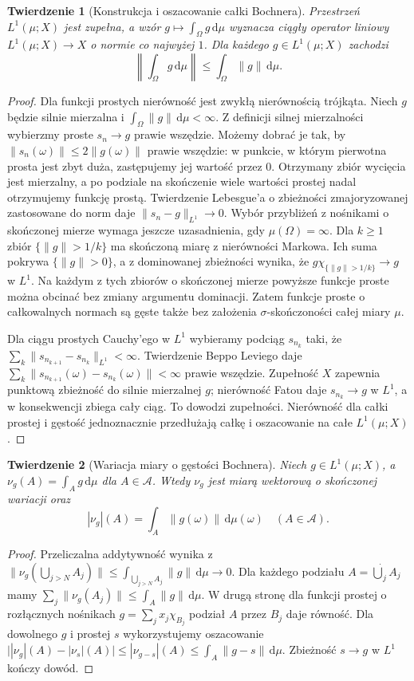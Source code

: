 \documentclass[11pt,a4paper,oneside]{book}
\numberwithin{equation}{chapter}
\theoremstyle{plain}
\newtheorem{twierdzenie}{Twierdzenie}[chapter]
\theoremstyle{definition}
\theoremstyle{remark}
\begin{document}
\begin{twierdzenie}[Konstrukcja i oszacowanie całki Bochnera]
\label{thm:bochner-basic-30}
Przestrzeń $L^1(\mu;X)$ jest zupełna, a wzór
$g\mapsto\int_\Omega g\,\mathrm d\mu$ wyznacza
ciągły operator liniowy $L^1(\mu;X)\to X$
o normie co najwyżej $1$. Dla każdego $g\in L^1(\mu;X)$
zachodzi
\[
 \left\|\int_\Omega g\,\mathrm d\mu\right\|
 \le\int_\Omega\|g\|\,\mathrm d\mu.
\]
\end{twierdzenie}
\begin{proof}
Dla funkcji prostych nierówność jest zwykłą nierównością
trójkąta. Niech $g$ będzie silnie mierzalna i
$\int_\Omega\|g\|\,\mathrm d\mu<\infty$.
Z definicji silnej mierzalności wybierzmy proste
$s_n\to g$ prawie wszędzie. Możemy dobrać je tak, by
$\|s_n(\omega)\|\le2\|g(\omega)\|$ prawie wszędzie:
w punkcie, w którym pierwotna prosta jest zbyt duża,
zastępujemy jej wartość przez $0$. Otrzymany zbiór
wycięcia jest mierzalny, a po podziale na skończenie
wiele wartości prostej nadal otrzymujemy funkcję prostą.
Twierdzenie Lebesgue'a o zbieżności zmajoryzowanej
zastosowane do norm daje $\|s_n-g\|_{L^1}\to0$.
Wybór przybliżeń z nośnikami o skończonej mierze
wymaga jeszcze uzasadnienia, gdy $\mu(\Omega)=\infty$.
Dla $k\ge1$ zbiór $\{\|g\|>1/k\}$ ma skończoną
miarę z nierówności Markowa. Ich suma pokrywa
$\{\|g\|>0\}$, a z dominowanej zbieżności wynika,
że $g\chi_{\{\|g\|>1/k\}}\to g$ w $L^1$.
Na każdym z tych zbiorów o skończonej mierze
powyższe funkcje proste można obcinać bez zmiany
argumentu dominacji. Zatem funkcje proste
o całkowalnych normach są gęste także bez
założenia $\sigma$-skończoności całej miary $\mu$.

Dla ciągu prostych Cauchy'ego w $L^1$ wybieramy
podciąg $s_{n_k}$ taki, że
$\sum_k\|s_{n_{k+1}}-s_{n_k}\|_{L^1}<\infty$.
Twierdzenie Beppo Leviego daje
$\sum_k\|s_{n_{k+1}}(\omega)-s_{n_k}(\omega)\|<\infty$
prawie wszędzie. Zupełność $X$ zapewnia punktową
zbieżność do silnie mierzalnej $g$; nierówność Fatou
daje $s_{n_k}\to g$ w $L^1$, a w konsekwencji zbiega
cały ciąg. To dowodzi zupełności. Nierówność dla całki
prostej i gęstość jednoznacznie przedłużają całkę
i oszacowanie na całe $L^1(\mu;X)$.
\end{proof}

\begin{twierdzenie}[Wariacja miary o gęstości Bochnera]
\label{thm:variation-density-30}
Niech $g\in L^1(\mu;X)$, a
$\nu_g(A)=\int_Ag\,\mathrm d\mu$ dla $A\in\mathcal A$.
Wtedy $\nu_g$ jest miarą wektorową o skończonej wariacji
oraz
\[
 |\nu_g|(A)=\int_A\|g(\omega)\|\,\mathrm d\mu(\omega)
 \quad(A\in\mathcal A).
\]
\end{twierdzenie}
\begin{proof}
Przeliczalna addytywność wynika z
$\|\nu_g(\bigcup_{j>N}A_j)\|
\le\int_{\bigcup_{j>N}A_j}\|g\|\,\mathrm d\mu\to0$.
Dla każdego podziału $A=\dot\bigcup_jA_j$ mamy
$\sum_j\|\nu_g(A_j)\|\le\int_A\|g\|\,\mathrm d\mu$.
W drugą stronę dla funkcji prostej o rozłącznych
nośnikach $g=\sum_jx_j\chi_{B_j}$ podział $A$ przez
$B_j$ daje równość. Dla dowolnego $g$ i prostej $s$
wykorzystujemy oszacowanie
$\big||\nu_g|(A)-|\nu_s|(A)\big|
\le|\nu_{g-s}|(A)\le\int_A\|g-s\|\,\mathrm d\mu$.
Zbieżność $s\to g$ w $L^1$ kończy dowód.
\end{proof}
\end{document}
